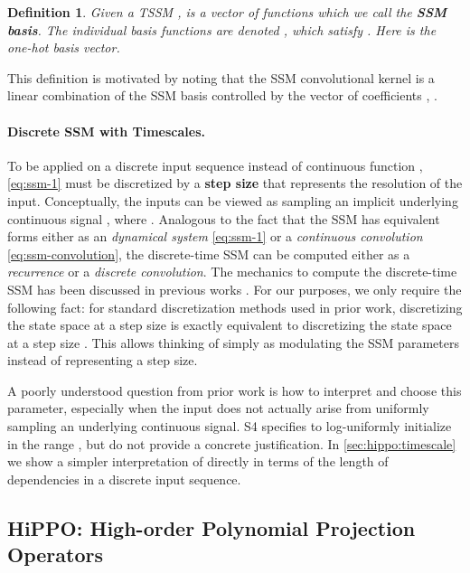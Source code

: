 \documentclass{article}
\newtheorem{definition}{Definition}
\begin{document}
\begin{definition}\label{def:ssm-basis}
  Given a TSSM ,
   is a vector of  functions
  which we call the \textbf{SSM basis}. The individual basis functions are denoted ,
  which satisfy . Here  is the one-hot basis vector.
\end{definition}
This definition is motivated by noting that the SSM convolutional kernel is a linear combination
of the SSM basis controlled by the vector of coefficients ,
.



\paragraph{Discrete SSM with Timescales.}
To be applied on a discrete input sequence  instead of continuous function ,
\eqref{eq:ssm-1} must be discretized by a \textbf{step size}  that represents the resolution of the input.
Conceptually, the inputs  can be viewed as sampling an implicit underlying continuous signal , where .
Analogous to the fact that the SSM has equivalent forms either as an \emph{dynamical system} \eqref{eq:ssm-1} or a \emph{continuous convolution} \eqref{eq:ssm-convolution},
the discrete-time SSM can be computed either as a \emph{recurrence} or a \emph{discrete convolution}.
The mechanics to compute the discrete-time SSM has been discussed in previous works \citep{gu2021lssl,gu2022efficiently}.
For our purposes, we only require the following fact:
for standard discretization methods used in prior work, discretizing the state space  at a step size  is exactly equivalent to discretizing the state space  at a step size .
This allows thinking of  simply as modulating the SSM parameters  instead of representing a step size.

A poorly understood question from prior work is how to interpret and choose this  parameter, especially when the input 
does not actually arise from uniformly sampling an underlying continuous signal. S4 specifies to log-uniformly initialize  in the range , but do not provide a concrete justification.
In \cref{sec:hippo:timescale} we show a simpler interpretation of  directly in terms of the length of dependencies in a discrete input sequence.









\subsection{HiPPO: High-order Polynomial Projection Operators}
\label{sec:background:hippo}
\end{document}
